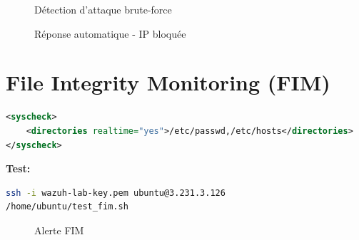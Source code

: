 \documentclass[12pt,a4paper]{article}
\begin{document}
\begin{figure}[H]
    \centering
    \caption{Détection d'attaque brute-force}
    \label{fig:brute-force}
\end{figure}

\begin{figure}[H]
    \centering
    \caption{Réponse automatique - IP bloquée}
    \label{fig:ip-blocked}
\end{figure}

\section{File Integrity Monitoring (FIM)}

\begin{lstlisting}[language=xml]
<syscheck>
    <directories realtime="yes">/etc/passwd,/etc/hosts</directories>
</syscheck>
\end{lstlisting}

\textbf{Test:}
\begin{lstlisting}[language=bash]
ssh -i wazuh-lab-key.pem ubuntu@3.231.3.126
/home/ubuntu/test_fim.sh
\end{lstlisting}

\begin{figure}[H]
    \centering
    \caption{Alerte FIM}
    \label{fig:fim-alert}
\end{figure}
\end{document}

